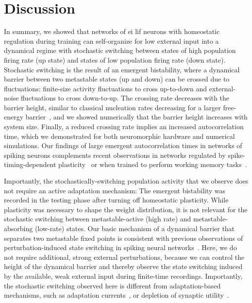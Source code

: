\section{\label{sec:discussion}Discussion}

In summary, we showed that networks of \gls{ei} \gls{lif} neurons with homeostatic regulation during training can self-organize for low external input into a dynamical regime with stochastic switching between states of high population firing rate (up state) and states of low population firing rate (down state).
Stochastic switching is the result of an emergent bistability, where a dynamical barrier between two metastable states (up and down) can be crossed due to fluctuations: finite-size activity fluctuations to cross up-to-down and external-noise fluctuations to cross down-to-up.
The crossing rate decreases with the barrier height, similar to classical nucleation rates decreasing for a larger free-energy barrier~\cite{feder_homogeneous_1966, kashchiev_nucleation_2000, zierenberg_canonical_2017}, and we showed numerically that the barrier height increases with system size.
Finally, a reduced crossing rate implies an increased autocorrelation time, which we demonstrated for both neuromorphic hardware and numerical simulations.
Our findings of large emergent autocorrelation times in networks of spiking neurons complements recent observations in networks regulated by spike-timing-dependent plasticity~\cite{cramer_control_2020} or when trained to perform working memory tasks~\cite{kim_strong_2021}.


Importantly, the stochastically-switching population activity that we observe does not require an active adaptation mechanism:
The emergent bistability was recorded in the testing phase after turning off homeostatic plasticity.
While plasticity was necessary to shape the weight distribution, it is not relevant for the stochastic switching between metastable-active (high rate) and metastable-absorbing (low-rate) states.
Our basic mechanism of a dynamical barrier that separates two metastable fixed points is consistent with previous observations of perturbation-induced state switching in spiking neural networks~\cite{brunel_effects_2001, renart_mean-driven_2006, tartaglia_bistability_2017}.
Here, we do not require additional, strong external perturbations, because we can control the height of the dynamical barrier and thereby observe the state switching induced by the available, weak external input during finite-time recordings.
Importantly, the stochastic switching observed here is different from adaptation-based mechanisms, such as adaptation currents~\cite{parga_network_2007}, or depletion of synaptic utility~\cite{millman_self-organized_2010, bonachela_self-organization_2010}.


